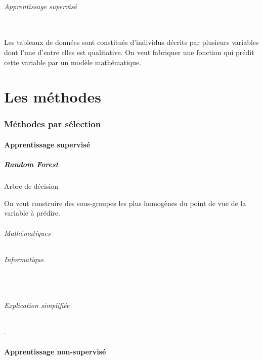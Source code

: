 \documentclass[12pt]{report}
\begin{document}
\paragraph{Apprentissage supervisé}\mbox{}\\

Les tableaux de données sont constitués d'individus décrits par plusieurs variables dont l'une d'entre elles est qualitative. On veut fabriquer une fonction qui prédit cette variable par un modèle mathématique.


\newpage
\part{Les méthodes}


\section{Méthodes par sélection}


\subsection{Apprentissage supervisé}

\subsubsection{Random Forest}

Arbre de décision

On veut construire des sous-groupes les plus homogènes du point de vue de la variable à prédire.

\paragraph{Mathématiques}
 
\paragraph{Informatique}\mbox{}\\

\paragraph{Explication simplifiée}. 

\subsection{Apprentissage non-supervisé}
\end{document}
